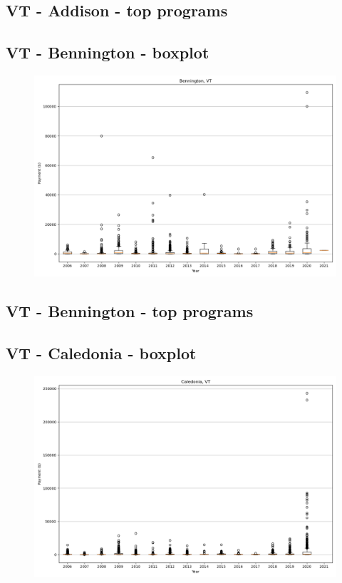 \subsection*{VT - Addison - top programs}

\newpage
\subsection*{VT - Bennington - boxplot}
\begin{figure}[h]
\centering
\includegraphics[width=7in]{../output/boxplots/counties/Bennington-VT_boxplot.png}
\end{figure}


\subsection*{VT - Bennington - top programs}

\newpage
\subsection*{VT - Caledonia - boxplot}
\begin{figure}[h]
\centering
\includegraphics[width=7in]{../output/boxplots/counties/Caledonia-VT_boxplot.png}
\end{figure}


